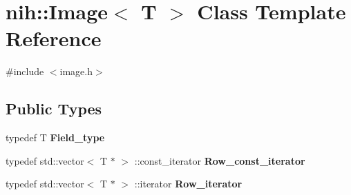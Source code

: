 \hypertarget{classnih_1_1_image}{
\section{nih\-:\-:\-Image$<$ \-T $>$ \-Class \-Template \-Reference}
\label{classnih_1_1_image}
}


{\ttfamily \#include $<$image.\-h$>$}

\subsection*{\-Public \-Types}
\begin{DoxyCompactItemize}
\item 
\hypertarget{classnih_1_1_image_abd70636148b2bb570d959437657923d9}{
typedef \-T {\bfseries \-Field\-\_\-type}}
\label{classnih_1_1_image_abd70636148b2bb570d959437657923d9}

\item 
\hypertarget{classnih_1_1_image_aa83a82e4c33be9e6a5d2c0b29f358027}{
typedef std\-::vector$<$ \-T $\ast$ $>$\*
\-::const\-\_\-iterator {\bfseries \-Row\-\_\-const\-\_\-iterator}}
\label{classnih_1_1_image_aa83a82e4c33be9e6a5d2c0b29f358027}

\item 
\hypertarget{classnih_1_1_image_a384c4a2ca348f3bb3aef7717754312e6}{
typedef std\-::vector$<$ \-T $\ast$ $>$\*
\-::iterator {\bfseries \-Row\-\_\-iterator}}
\label{classnih_1_1_image_a384c4a2ca348f3bb3aef7717754312e6}

\end{DoxyCompactItemize}
